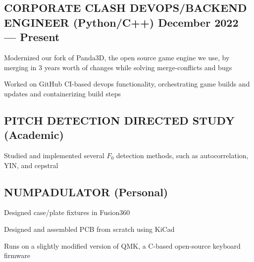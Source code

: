 \documentclass[letter,10pt]{article}
\begin{document}
\subsection{{CORPORATE CLASH DEVOPS/BACKEND ENGINEER (Python/C++)} \hfill December 2022 --- Present}
\begin{zitemize}
\item Modernized our fork of Panda3D, the open source game engine we use, by merging in 3 years worth of changes while solving merge-conflicts and bugs
\item Worked on GitHub CI-based devops functionality, orchestrating game builds and updates and containerizing build steps
\end{zitemize}

\subsection{{PITCH DETECTION DIRECTED STUDY (Academic)} \hfill {}}
\begin{zitemize}
\item Studied and implemented several $F_0$ detection methods, such as autocorrelation, YIN, and cepstral
\end{zitemize}

\subsection{{NUMPADULATOR (Personal)} \hfill {}}
\begin{zitemize}
\item Designed case/plate fixtures in Fusion360
\item Designed and assembled PCB from scratch using KiCad
\item Runs on a slightly modified version of QMK, a C-based open-source keyboard firmware
\end{zitemize}
\end{document}
